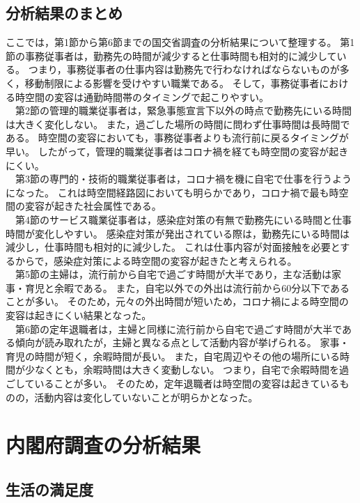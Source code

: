 \documentclass[paper={210mm,297mm},line_length=35zw,number_of_lines=31,head_space=30mm,gutter=40mm,baselineskip=2.0zw,headfoot_verticalposition=1.5zw]{jlreq} %
\begin{document}
\subsection{分析結果のまとめ}

ここでは，第1節から第6節までの国交省調査の分析結果について整理する。
第1節の事務従事者は，勤務先の時間が減少すると仕事時間も相対的に減少している。
つまり，事務従事者の仕事内容は勤務先で行わなければならないものが多く，移動制限による影響を受けやすい職業である。
そして，事務従事者における時空間の変容は通勤時間帯のタイミングで起こりやすい。\\
　第2節の管理的職業従事者は，緊急事態宣言下以外の時点で勤務先にいる時間は大きく変化しない。
また，過ごした場所の時間に問わず仕事時間は長時間である。
時空間の変容においても，事務従事者よりも流行前に戻るタイミングが早い。
したがって，管理的職業従事者はコロナ禍を経ても時空間の変容が起きにくい。\\
　第3節の専門的・技術的職業従事者は，コロナ禍を機に自宅で仕事を行うようになった。
これは時空間経路図においても明らかであり，コロナ禍で最も時空間の変容が起きた社会属性である。\\
　第4節のサービス職業従事者は，感染症対策の有無で勤務先にいる時間と仕事時間が変化しやすい。
感染症対策が発出されている際は，勤務先にいる時間は減少し，仕事時間も相対的に減少した。
これは仕事内容が対面接触を必要とするからで，感染症対策による時空間の変容が起きたと考えられる。\\
　第5節の主婦は，流行前から自宅で過ごす時間が大半であり，主な活動は家事・育児と余暇である。
また，自宅以外での外出は流行前から60分以下であることが多い。
そのため，元々の外出時間が短いため，コロナ禍による時空間の変容は起きにくい結果となった。\\
　第6節の定年退職者は，主婦と同様に流行前から自宅で過ごす時間が大半である傾向が読み取れたが，主婦と異なる点として活動内容が挙げられる。
家事・育児の時間が短く，余暇時間が長い。
また，自宅周辺やその他の場所にいる時間が少なくとも，余暇時間は大きく変動しない。
つまり，自宅で余暇時間を過ごしていることが多い。
そのため，定年退職者は時空間の変容は起きているものの，活動内容は変化していないことが明らかとなった。\\

\section{内閣府調査の分析結果}

\subsection{生活の満足度}
\end{document}
